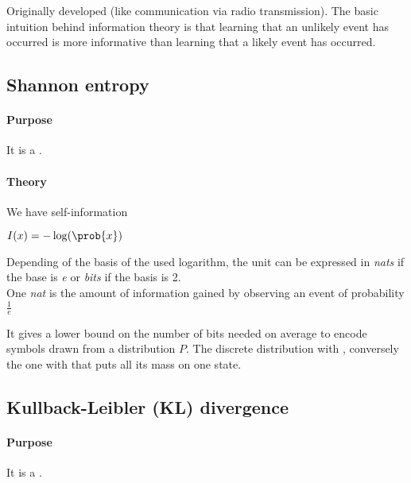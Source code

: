 Originally developed 
(like communication via radio transmission).
The basic intuition behind information theory is that learning that an unlikely event has occurred
is more informative than learning that a likely event has occurred.
\subsection{Shannon entropy}
\paragraph{Purpose}
It is a .
\paragraph{Theory}
We have self-information
\begin{center}
    $I(x) = -\log(\prob{x})$
\end{center}
Depending of the basis of the used logarithm, the unit can be expressed in \emph{nats} if the base is
\emph{e} or \emph{bits} if the basis is 2.\\
One \emph{nat} is the amount of information gained by observing an event of probability $\frac{1}{e}$


\begin{center}
\end{center}
It gives a lower bound on the number of bits needed on average to encode symbols drawn from a 
distribution $P$.
The discrete distribution with ,
conversely the one with  that puts all its
mass on one state.


\subsection{Kullback-Leibler (KL) divergence}
\paragraph{Purpose}
It is a .

